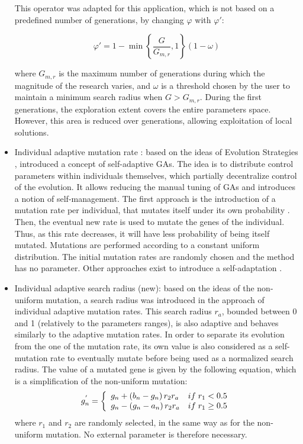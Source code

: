 \documentclass{ametsoc}
\begin{document}
\begin{itemize}
	This operator was adapted for this application, which is not based on a predefined number of generations, by changing $\varphi$ with $\varphi'$:
	
	\begin{equation}
	\varphi' = 1 - \min \left\lbrace \dfrac{G}{G_{m,r}}, 1 \right\rbrace \left(1-\omega\right)
	\end{equation}
	
	where $G_{m,r}$ is the maximum number of generations during which the magnitude of the research varies, and $\omega$ is a threshold chosen by the user to maintain a minimum search radius when $G>G_{m,r}$. During the first generations, the exploration extent covers the entire parameters space. However, this area is reduced over generations, allowing exploitation of local solutions.
	
	\item Individual adaptive mutation rate \citep{Back1992a}: based on the ideas of Evolution Strategies \citep[see][]{Rechenberg1973, Schwefel1981}, \citet{Back1992a} introduced a concept of self-adaptive GAs. The idea is to distribute control parameters within individuals themselves, which partially decentralize control of the evolution. It allows reducing the manual tuning of GAs and introduces a notion of self-management. The first approach is the introduction of a mutation rate per individual, that mutates itself under its own probability \citep{Back1992a}. Then, the eventual new rate is used to mutate the genes of the individual. Thus, as this rate decreases, it will have less probability of being itself mutated. Mutations are performed according to a constant uniform distribution. The initial mutation rates are randomly chosen \citep{Back1992a} and the method has no parameter. Other approaches exist to introduce a self-adaptation \citep[see][]{Smith1997a, Deb1999, Deb2001a}.
	
	\item Individual adaptive search radius (new): based on the ideas of the non-uniform mutation, a search radius was introduced in the approach of individual adaptive mutation rates. This search radius $r_{a}$, bounded between 0 and 1 (relatively to the parameters ranges), is also adaptive and behaves similarly to the adaptive mutation rates. In order to separate its evolution from the one of the mutation rate, its own value is also considered as a self-mutation rate to eventually mutate before being used as a normalized search radius. The value of a mutated gene is given by the following equation, which is a simplification of the non-uniform mutation:
	\begin{equation}
	g_{n}^{'} = 
	\left\lbrace \begin{array}{l l} 
	g_{n} + \left(b_{n}-g_{n}\right) r_{2} r_{a} & if \; r_{1} < 0.5 \\
	g_{n} - \left(g_{n}-a_{n}\right) r_{2} r_{a} & if \; r_{1} \geq 0.5 \\
	\end{array} \right.
	\label{equation_mutation_rayon_adaptatif}
	\end{equation}
	where $r_{1}$ and $r_{2}$ are randomly selected, in the same way as for the non-uniform mutation. No external parameter is therefore necessary.
	

\end{itemize}
\end{document}
